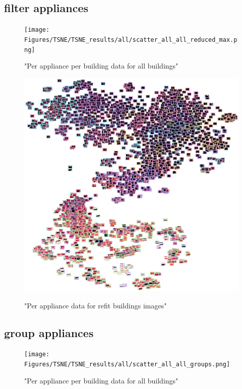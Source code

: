 \subsection{filter appliances}


\begin{figure}[H]
	\centering
	\caption{"Per appliance per building data for all buildings"}
	\texttt{[image: Figures/TSNE/TSNE\_results/all/scatter\_all\_all\_reduced\_max.png]}
	\label{fig:tsne_papb_scatter_all_reduced}
\end{figure}

\begin{figure}[H]
	\centering
	\caption{"Per appliance data for refit buildings images"}
	\includegraphics[width=.9\textwidth]{Figures/TSNE/TSNE_results/all/img_scatter_allall_reduced_max.png}
	\label{fig:tsne_papb_img_scatter_all_reduced}
\end{figure}

\subsection{group appliances}

\begin{figure}[H]
	\centering
	\caption{"Per appliance per building data for all buildings"}
	\texttt{[image: Figures/TSNE/TSNE\_results/all/scatter\_all\_all\_groups.png]}
	\label{fig:tsne_papb_scatter_all_groups}
\end{figure}

